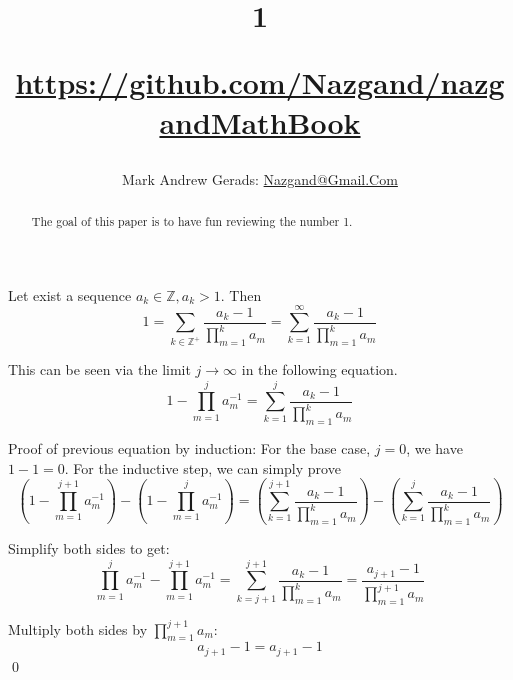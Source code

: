 \documentclass[]{article}
\author{Mark Andrew Gerads: \href{MailTo:Nazgand@Gmail.Com}{Nazgand@Gmail.Com}}
\title{
	1
	
	\href{https://github.com/Nazgand/nazgandMathBook}{https://github.com/Nazgand/nazgandMathBook}
}
\newcommand{\pqty}[1]{{\left(#1\right)}}
\numberwithin{equation}{section}
\begin{document}
	
	\maketitle
	
	\begin{abstract}
		The goal of this paper is to have fun reviewing the number 1.
	\end{abstract}
	
	Let exist a sequence $a_k\in\mathbb{Z},a_k>1$. Then
	\begin{equation}
		1=\sum_{k\in\mathbb{Z}^+}\frac{a_k-1}{\prod_{m=1}^{k}a_m}
		=\sum_{k=1}^{\infty}\frac{a_k-1}{\prod_{m=1}^{k}a_m}
	\end{equation}


	This can be seen via the limit $j\to\infty$ in the following equation.
	\begin{equation}
	1-\prod_{m=1}^{j}a_m^{-1}=
	\sum_{k=1}^{j}\frac{a_k-1}{\prod_{m=1}^{k}a_m}
	\end{equation}
	
	Proof of previous equation by induction: For the base case, $j=0$, we have $1-1=0$.
	For the inductive step, we can simply prove
	\begin{equation}
		\pqty{1-\prod_{m=1}^{j+1}a_m^{-1}}-\pqty{1-\prod_{m=1}^{j}a_m^{-1}}=
		\pqty{\sum_{k=1}^{j+1}\frac{a_k-1}{\prod_{m=1}^{k}a_m}}-
		\pqty{\sum_{k=1}^{j}\frac{a_k-1}{\prod_{m=1}^{k}a_m}}
	\end{equation}
	
	Simplify both sides to get:
	\begin{equation}
		\prod_{m=1}^{j}a_m^{-1}-\prod_{m=1}^{j+1}a_m^{-1}
		=\sum_{k=j+1}^{j+1}\frac{a_k-1}{\prod_{m=1}^{k}a_m}
		=\frac{a_{j+1}-1}{\prod_{m=1}^{j+1}a_m}
	\end{equation}

	Multiply both sides by $\prod_{m=1}^{j+1}a_m$:
	\begin{equation}
		a_{j+1}-1=a_{j+1}-1
	\end{equation}
	\qed
\end{document}
